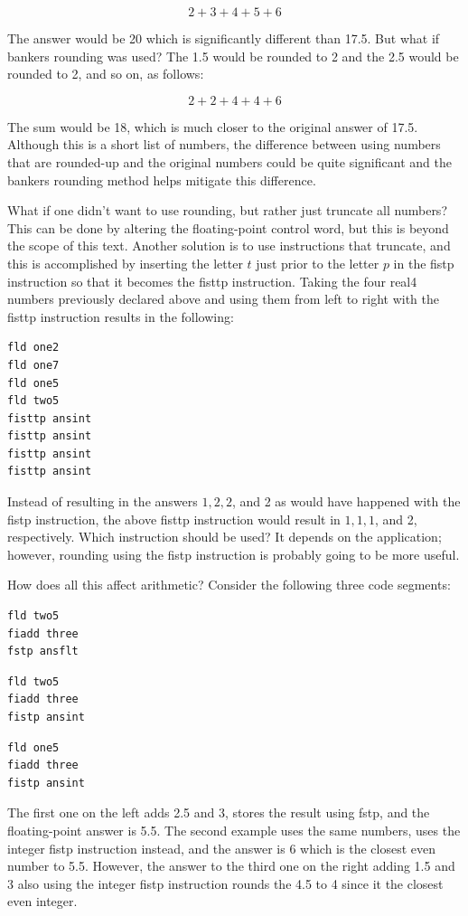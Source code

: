 \documentclass[10pt]{book}
\begin{document}
$$
2 + 3 + 4 + 5 + 6
$$

The answer would be 20 which is significantly different than 17.5. But what if bankers rounding was used? The 1.5 would be rounded to 2 and the 2.5 would be rounded to 2, and so on, as follows:

$$
2 + 2 + 4 + 4 + 6
$$

The sum would be 18, which is much closer to the original answer of 17.5. Although this is a short list of numbers, the difference between using numbers that are rounded-up and the original numbers could be quite significant and the bankers rounding method helps mitigate this difference.

What if one didn't want to use rounding, but rather just truncate all numbers? This can be done by altering the floating-point control word, but this is beyond the scope of this text. Another solution is to use instructions that truncate, and this is accomplished by inserting the letter $t$ just prior to the letter $p$ in the fistp instruction so that it becomes the fisttp instruction. Taking the four real4 numbers previously declared above and using them from left to right with the fisttp instruction results in the following:
\begin{verbatim}
fld one2
fld one7
fld one5
fld two5
fisttp ansint
fisttp ansint
fisttp ansint
fisttp ansint
\end{verbatim}

Instead of resulting in the answers $1,2,2$, and 2 as would have happened with the fistp instruction, the above fisttp instruction would result in $1,1,1$, and 2, respectively. Which instruction should be used? It depends on the application; however, rounding using the fistp instruction is probably going to be more useful.

How does all this affect arithmetic? Consider the following three code segments:

\begin{verbatim}
fld two5
fiadd three
fstp ansflt
\end{verbatim}

\begin{verbatim}
fld two5
fiadd three
fistp ansint
\end{verbatim}

\begin{verbatim}
fld one5
fiadd three
fistp ansint
\end{verbatim}

The first one on the left adds 2.5 and 3, stores the result using fstp, and the floating-point answer is 5.5. The second example uses the same numbers, uses the integer fistp instruction instead, and the answer is 6 which is the closest even number to 5.5. However, the answer to the third one on the right adding 1.5 and 3 also using the integer fistp instruction rounds the 4.5 to 4 since it the closest even integer.
\end{document}
